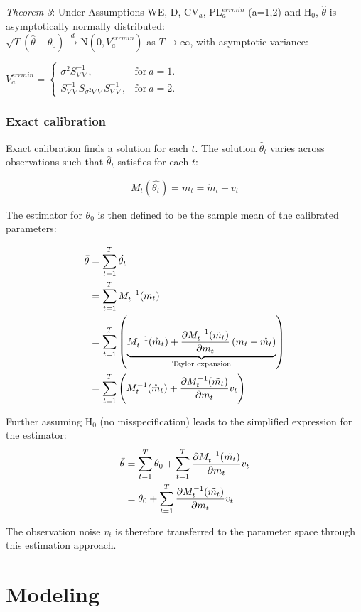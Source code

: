 \documentclass[11pt,a4paper,notitlepage]{article}
\numberwithin{equation}{section}
\begin{document}
\begin{adjustwidth}{30 pt}{0 pt}
\emph{Theorem 3}: Under Assumptions WE, D, CV$_a$, PL$_a^{errmin}$ (a=1,2) and H$_0$, $\hat{\theta}$ is asymptotically normally distributed:\\

 $\sqrt{T}\left(\hat{\theta}-\theta_0\right) \overset{d}{\rightarrow} \mathrm{N}(0, 
V_a^{errmin})$ as $T\rightarrow\infty$, with asymptotic variance:
 
$ V_a^{errmin}=
 \begin{cases} 
 \sigma^2S_{\nabla\nabla}^{-1},& \text{for}~ a=1. \\ 
  S_{\nabla\nabla}^{-1}S_{\sigma^2\nabla\nabla}S_{\nabla\nabla}^{-1},& \text{for}~ a=2.
 \end{cases}  
$
\end{adjustwidth}

\subsubsection*{Exact calibration}

Exact calibration finds a solution for each $t$. The solution $\hat{\theta}_t$ varies across observations such that $\hat{\theta}_t$ satisfies for each $t$:

\begin{equation}
M_t(\hat{\theta_t})= m_t = \mathring{m}_t + v_t
\end{equation}


The estimator for $\theta_0$ is then defined to be the sample mean of the calibrated parameters: 

\begin{align}
\bar{\theta}& =\sum\limits_{t=1}^T \hat{\theta_t}\\
&= \sum\limits_{t=1}^T M_t^{-1}(m_t)\notag\\
&= \sum\limits_{t=1}^T \left( \underbrace{M_t^{-1}(\mathring{m}_t) + \frac{\partial M_t^{-1}(\tilde{m_t})}{\partial m_t} \left(m_t-\mathring{m_t}\right)}_{\text{Taylor expansion}} \right) \notag\\
&= \sum\limits_{t=1}^T \left( M_t^{-1}(\mathring{m}_t) + \frac{\partial M_t^{-1}(\tilde{m_t})}{\partial m_t} v_t \right)
\end{align}



Further assuming H$_0$ (no misspecification) leads to the simplified expression for the estimator: 
\begin{align}
\bar{\theta}& = \sum\limits_{t=1}^T \theta_0 + \sum\limits_{t=1}^T \frac{\partial M_t^{-1}(\tilde{m_t})}{\partial m_t} v_t \notag\\
&= \theta_0 + \sum\limits_{t=1}^T \frac{\partial M_t^{-1}(\tilde{m_t})}{\partial m_t} v_t
\end{align}
 
The observation noise $v_t$ is therefore transferred to the parameter space through this estimation approach. 




\newpage
\section{Modeling}
\end{document}
